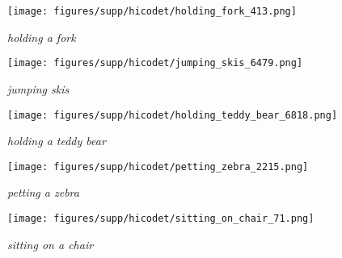 \documentclass[10pt,twocolumn,letterpaper]{article}
\begin{document}
\begin{figure*}
    \begin{subfigure}[t]{0.19\linewidth}
        \centering
        \texttt{[image: figures/supp/hicodet/holding\_fork\_413.png]}
        \caption{\textit{holding a fork}}
        \label{fig:holding-fork}
    \end{subfigure}
    \hspace{4pt}
    \begin{subfigure}[t]{0.19\linewidth}
        \centering
        \texttt{[image: figures/supp/hicodet/jumping\_skis\_6479.png]}
        \caption{\textit{jumping skis}}
        \label{fig:jumping-ski}
    \end{subfigure}
    \hspace{-1pt}
    \begin{subfigure}[t]{0.19\linewidth}
        \centering
        \texttt{[image: figures/supp/hicodet/holding\_teddy\_bear\_6818.png]}
        \caption{\textit{holding a teddy bear}}
        \label{fig:holding-teddy-bear}
    \end{subfigure}
    \hfill \begin{subfigure}[t]{0.19\linewidth}
        \centering
        \texttt{[image: figures/supp/hicodet/petting\_zebra\_2215.png]}
        \caption{\textit{petting a zebra}}
        \label{fig:petting-zebra}
    \end{subfigure}
    \hfill \begin{subfigure}[t]{0.19\linewidth}
        \centering
        \texttt{[image: figures/supp/hicodet/sitting\_on\_chair\_71.png]}
        \caption{\textit{sitting on a chair}}
        \label{fig:sitting-on-chair}
    \end{subfigure}


\end{figure*}
\end{document}
